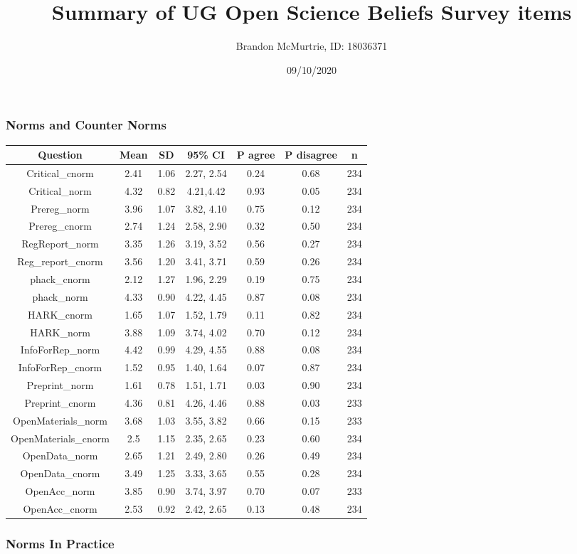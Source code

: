 \documentclass[
]{article}
\title{Summary of UG Open Science Beliefs Survey items}
\author{Brandon McMurtrie, ID: 18036371}
\date{09/10/2020}
\begin{document}
\maketitle

\hypertarget{norms-and-counter-norms}{%
\subsubsection{Norms and Counter Norms}\label{norms-and-counter-norms}}

\begin{longtable}[]{@{}ccccccc@{}}
\toprule
Question & Mean & SD & 95\% CI & P agree & P disagree & n\tabularnewline
\midrule
\endhead
Critical\_cnorm & 2.41 & 1.06 & 2.27, 2.54 & 0.24 & 0.68 &
234\tabularnewline
Critical\_norm & 4.32 & 0.82 & 4.21,4.42 & 0.93 & 0.05 &
234\tabularnewline
Prereg\_norm & 3.96 & 1.07 & 3.82, 4.10 & 0.75 & 0.12 &
234\tabularnewline
Prereg\_cnorm & 2.74 & 1.24 & 2.58, 2.90 & 0.32 & 0.50 &
234\tabularnewline
RegReport\_norm & 3.35 & 1.26 & 3.19, 3.52 & 0.56 & 0.27 &
234\tabularnewline
Reg\_report\_cnorm & 3.56 & 1.20 & 3.41, 3.71 & 0.59 & 0.26 &
234\tabularnewline
phack\_cnorm & 2.12 & 1.27 & 1.96, 2.29 & 0.19 & 0.75 &
234\tabularnewline
phack\_norm & 4.33 & 0.90 & 4.22, 4.45 & 0.87 & 0.08 &
234\tabularnewline
HARK\_cnorm & 1.65 & 1.07 & 1.52, 1.79 & 0.11 & 0.82 &
234\tabularnewline
HARK\_norm & 3.88 & 1.09 & 3.74, 4.02 & 0.70 & 0.12 & 234\tabularnewline
InfoForRep\_norm & 4.42 & 0.99 & 4.29, 4.55 & 0.88 & 0.08 &
234\tabularnewline
InfoForRep\_cnorm & 1.52 & 0.95 & 1.40, 1.64 & 0.07 & 0.87 &
234\tabularnewline
Preprint\_norm & 1.61 & 0.78 & 1.51, 1.71 & 0.03 & 0.90 &
234\tabularnewline
Preprint\_cnorm & 4.36 & 0.81 & 4.26, 4.46 & 0.88 & 0.03 &
233\tabularnewline
OpenMaterials\_norm & 3.68 & 1.03 & 3.55, 3.82 & 0.66 & 0.15 &
233\tabularnewline
OpenMaterials\_cnorm & 2.5 & 1.15 & 2.35, 2.65 & 0.23 & 0.60 &
234\tabularnewline
OpenData\_norm & 2.65 & 1.21 & 2.49, 2.80 & 0.26 & 0.49 &
234\tabularnewline
OpenData\_cnorm & 3.49 & 1.25 & 3.33, 3.65 & 0.55 & 0.28 &
234\tabularnewline
OpenAcc\_norm & 3.85 & 0.90 & 3.74, 3.97 & 0.70 & 0.07 &
233\tabularnewline
OpenAcc\_cnorm & 2.53 & 0.92 & 2.42, 2.65 & 0.13 & 0.48 &
234\tabularnewline
\bottomrule
\end{longtable}

\hypertarget{norms-in-practice}{%
\subsubsection{Norms In Practice}\label{norms-in-practice}}
\end{document}
